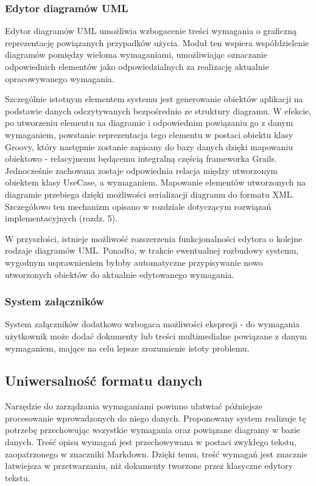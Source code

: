       \subsubsection{Edytor diagramów UML}

      Edytor diagramów UML umożliwia wzbogacenie treści wymagania o graficzną reprezentację powiązanych przypadków użycia. Moduł ten wspiera współdzielenie diagramów pomiędzy wieloma wymaganiami, umożliwiając oznaczanie odpowiednich elementów jako odpowiedzialnych za realizację aktualnie opracowywanego wymagania. 

      Szczególnie istotnym elementem systemu jest generowanie obiektów aplikacji na podstawie danych odczytywanych bezpośrednio ze struktury diagramu. W efekcie, po utworzeniu elementu na diagramie i odpowiednim powiązaniu go z danym wymaganiem, powstanie reprezentacja tego elementu w postaci obiektu klasy Groovy, który następnie zostanie zapisany do bazy danych dzięki mapowaniu obiektowo - relacyjnemu będącemu integralną częścią frameworka Grails. Jednocześnie zachowana zostaje odpowiednia relacja między utworzonym obiektem klasy UseCase, a wymaganiem. Mapowanie elementów utworzonych na diagramie przebiega dzięki możliwości serializacji diagramu do formatu XML. Szczegółowo ten mechanizm opisano w rozdziale dotyczącym rozwiązań implementacyjnych (rozdz. 5).

      W przyszłości, istnieje możliwość rozszerzenia funkcjonalności edytora o kolejne rodzaje diagramów UML. Ponadto, w trakcie ewentualnej rozbudowy systemu, wygodnym usprawnieniem byłoby automatyczne przypisywanie nowo utworzonych obiektów do aktualnie edytowanego wymagania.

      \subsubsection{System załączników}

      System załączników dodatkowo wzbogaca możliwości ekspresji - do wymagania użytkownik może dodać dokumenty lub treści multimedialne powiązane z danym wymaganiem, mające na celu lepsze zrozumienie istoty problemu.

    \subsection{Uniwersalność formatu danych}
      Narzędzie do zarządzania wymaganiami powinno ułatwiać późniejsze procesowanie wprowadzonych do niego danych. Proponowany system realizuje tę potrzebę przechowując wszystkie wymagania oraz powiązane diagramy w bazie danych. Treść opisu wymagań jest przechowywana w postaci zwykłego tekstu, zaopatrzonego w znaczniki Markdown. Dzięki temu, treść wymagań jest znacznie łatwiejsza w przetwarzaniu, niż dokumenty tworzone przez klasyczne edytory tekstu.
      

